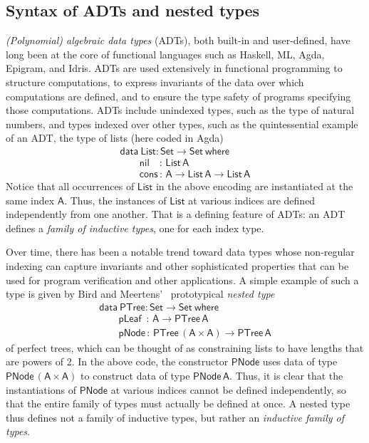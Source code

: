 \documentclass[9pt]{entcs} \usepackage{entcsmacro}
\begin{document}
\subsection{Syntax of ADTs and nested types}\label{ssec:syntax-adts}

\emph{(Polynomial) algebraic data types} (ADTs), both built-in and user-defined,
have long been at the core of functional languages such as Haskell, ML, Agda, Epigram, and Idris.
ADTs are used extensively in functional programming to structure computations,
to express invariants of the data over which computations are defined,
and to ensure the type safety of programs specifying those computations.
ADTs include unindexed types, such as the type of natural numbers,
and types indexed over other types, such as the quintessential example of an ADT,
the type of lists (here coded in Agda)
\begin{equation}\label{eq:list}
\begin{array}{l}
\mathsf{data\ List : Set \to Set\ where}\\
\mathsf{\;\;\;\;\;\;\;nil\,\,\,\,\,\, :\, List\,A}\\
\mathsf{\;\;\;\;\;\;\;cons\, :\, A \to List\,A \to List\,A} 
\end{array}
\end{equation}
Notice that all occurrences of $\mathsf{List}$ in the above encoding are instantiated at the same index $\mathsf{A}$.
Thus, the instances of $\mathsf{List}$ at various indices are defined independently from one another.
That is a defining feature of ADTs:
an ADT defines a \emph{family of inductive types}, one for each index type.

Over time, there has been a notable trend toward data types
whose non-regular indexing can capture invariants and other sophisticated properties
that can be used for program verification and other applications.
A simple example of such a type is given by Bird and Meertens’~\cite{bm98} prototypical \emph{nested type}
\begin{equation}\label{eq:ptree}
\begin{array}{l}
\mathsf{data\ PTree : Set \to Set\ where}\\
\mathsf{\;\;\;\;\;\;\;pLeaf\,\,\, :\, A \to PTree\,A}\\
\mathsf{\;\;\;\;\;\;\;pNode\, :\, PTree\,(A \times A) \to PTree\,A} 
\end{array}
\end{equation}
of perfect trees, which can be thought of as constraining lists to have lengths that are powers of 2.
In the above code, the constructor $\mathsf{PNode}$ uses data of type $\mathsf{PNode\,(A \times A)}$ to construct data of type $\mathsf{PNode\,A}$.
Thus, it is clear that the instantiations of $\mathsf{PNode}$ at various indices cannot be defined independently, so that the entire family of types must actually be defined at once.
A nested type thus defines not a family of inductive types, but rather an \emph{inductive family of types}.
\end{document}
